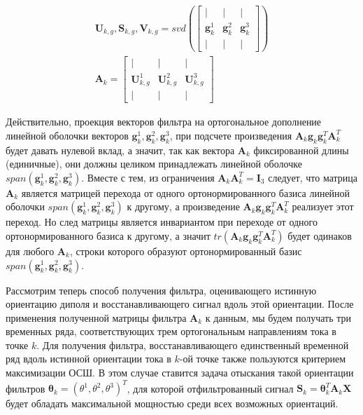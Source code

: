 \begin{gather}
    \mathbf{U}_{k,g}, \mathbf{S}_{k,g}, \mathbf{V}_{k,g} = svd\left(
            \begin{bmatrix}
                |                 & |              & |              \\
                \mathbf{g}_k^1    & \mathbf{g}_k^2 & \mathbf{g}_k^3 \\
                |                 & |              & |
            \end{bmatrix}
     \right)\\
    \mathbf{A}_k = 
            \begin{bmatrix}
                |                 & |              & |              \\
                \mathbf{U}_{k, g}^1    & \mathbf{U}_{k,g}^2 & \mathbf{U}_{k,g}^3 \\
                |                 & |              & |
            \end{bmatrix}
\end{gather}

Действительно, проекция векторов фильтра
на ортогональное дополнение линейной оболочки векторов
$\mathbf{g}_k^1, \mathbf{g}_k^2, \mathbf{g}_k^3$,
при подсчете произведения $\mathbf{A}_k \mathbf{g}_k \mathbf{g}_k^T \mathbf{A}_k^T$
будет давать нулевой вклад, а значит, так как вектора $\mathbf{A}_k$
фиксированной длины (единичные), они должны целиком принадлежать
линейной оболочке $span(\mathbf{g}_k^1, \mathbf{g}_k^2, \mathbf{g}_k^3)$.
Вместе с тем, из ограничения $\mathbf{A}_k \mathbf{A}_k^T = \mathbf{I}_3$ следует, что
матрица $\mathbf{A}_k$ является матрицей перехода от одного ортонормированного базиса
линейной оболочки $span(\mathbf{g}_k^1, \mathbf{g}_k^2, \mathbf{g}_k^3)$ к другому,
а произведение $\mathbf{A}_k \mathbf{g}_k \mathbf{g}_k^T \mathbf{A}_k^T$
реализует этот переход.
Но след матрицы является инвариантом при переходе от одного ортонормированного базиса к другому,
а значит $tr(\mathbf{A}_k \mathbf{g}_k \mathbf{g}_k^T \mathbf{A}_k^T)$
будет одинаков для любого $\mathbf{A}_k$, строки которого образуют ортонормированный базис
$span(\mathbf{g}_k^1, \mathbf{g}_k^2, \mathbf{g}_k^3)$.

Рассмотрим теперь способ получения фильтра, оценивающего истинную ориентацию диполя
и восстанавливающего сигнал вдоль этой ориентации.
После применения полученной матрицы фильтра $\mathbf{A}_k$ к данным,
мы будем получать три временных ряда, соответствующих трем ортогональным направлениям
тока в точке $k$. Для получения фильтра, восстанавливающего единственный временной ряд
вдоль истинной ориентации тока в $k$-ой точке также пользуются критерием максимизации ОСШ.
В этом случае ставится задача отыскания такой ориентации фильтров
$\mathbf{\theta}_k = (\theta^1, \theta^2, \theta^3)^T$, для
которой отфильтрованный сигнал $\mathbf{S}_k = \mathbf{\theta}_k^T \mathbf{A}_k \mathbf{X}$
будет обладать максимальной мощностью среди всех возможных ориентаций.


